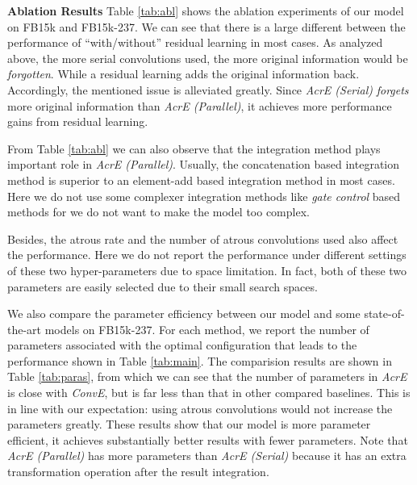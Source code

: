 \documentclass[11pt]{article}
\begin{document}
 




\noindent\textbf{Ablation Results} Table \ref{tab:abl} shows the ablation experiments of our model on FB15k and FB15k-237. We can see that there is a large different between the performance of “with/without” residual learning in most cases. As analyzed above, the more serial convolutions used, the more original information would be \emph{forgotten}. While a residual learning adds the original information back. Accordingly, the mentioned issue is  alleviated   greatly. Since \emph{AcrE (Serial)} \emph{forgets} more original information than \emph{AcrE (Parallel)}, it achieves more performance gains from residual learning.

From Table \ref{tab:abl} we can also observe that the integration method  plays important role in  \emph{AcrE (Parallel)}. Usually, the concatenation based integration method is superior to an element-add based integration method in most cases. Here we do not use some complexer integration methods like \emph{gate control} based methods for we do not want to make the model too complex. 

Besides, the atrous rate and the number of atrous convolutions used also affect the performance. Here we do not report the performance under different settings of these two hyper-parameters due to  space limitation. In fact, both of these two parameters are easily selected due to their small search spaces.


 We also compare the parameter efficiency  between our model and some state-of-the-art models on FB15k-237. For each method, we report the number of parameters associated with the optimal configuration that  leads to the performance shown in Table \ref{tab:main}. The comparision results are shown in Table \ref{tab:paras}, from which we can see that the number of parameters in {\em AcrE} is   close  with {\em ConvE}, but is far less than that in  other compared baselines. This is in line with our expectation: using atrous convolutions would not increase the parameters greatly. These results show that  our model  is more parameter efficient, it achieves substantially better results with fewer parameters. Note that  \emph{AcrE (Parallel)}  has more parameters than  \emph{AcrE (Serial)} because it has an extra transformation operation after the result integration.   
\end{document}
